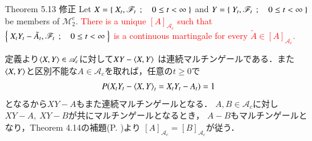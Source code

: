 	\begin{itembox}[l]{Theorem 5.13 修正}
		Let $X = \left\{\ X_t,\mathscr{F}_t\ \, ; \quad 0 \leq t < \infty\ \right\}$ and $Y = \left\{\ Y_t,\mathscr{F}_t\ \, ; \quad 0 \leq t < \infty\ \right\}$
		be members of $\mathscr{M}_2^c$. \textcolor{red}{There is a unique $[A]_{\mathscr{A}_c}$ such that
		$\left\{\ X_t Y_t - \tilde{A}_t,\mathscr{F}_t\ \, ; \quad 0 \leq t < \infty\ \right\}$ is a continuous martingale
		for every $\tilde{A} \in [A]_{\mathscr{A}_c}$.}
	\end{itembox}
	
	\begin{prf}
		定義より$\inprod<X,Y> \in \mathscr{A}_c$に対して$XY - \inprod<X,Y>$
		は連続マルチンゲールである．また$\inprod<X,Y>$と区別不能な$A \in \mathscr{A}_c$を取れば，任意の$t \geq 0$で
		\begin{align}
			P(X_t Y_t - \inprod<X,Y>_t = X_t Y_t - A_t) = 1
		\end{align}
		となるから$XY-A$もまた連続マルチンゲールとなる．
		$A,B \in \mathscr{A}_c$に対し$XY - A,\ XY-B$が共にマルチンゲールとなるとき，
		$A - B$もマルチンゲールとなり，Theorem 4.14の補題(P. \pageref{lem:uniqueness_of_Doob_Meyer_decomposition})より
		$[A]_{\mathscr{A}_c} = [B]_{\mathscr{A}_c}$が従う．
		\QED
	\end{prf}
